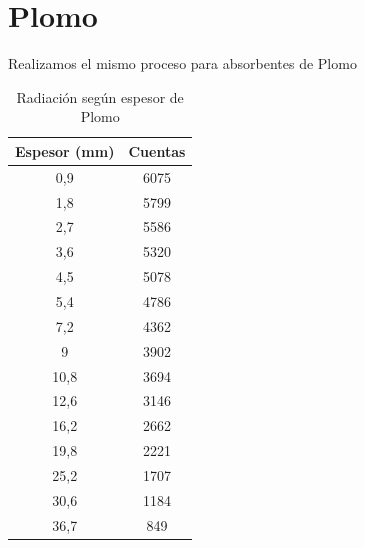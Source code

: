 \documentclass[a4paper,12pt,spanish]{article}
\begin{document}
	\section{Plomo}
	
	
	
	
	Realizamos el mismo proceso para absorbentes de Plomo
	
	
	\begin{table}[H]
		\centering
		\begin{tabular}{|c|c|}
			\hline
			Espesor (mm) & Cuentas \\ \hline
			0,9          & 6075    \\ \hline
			1,8          & 5799    \\ \hline
			2,7          & 5586    \\ \hline
			3,6          & 5320    \\ \hline
			4,5          & 5078    \\ \hline
			5,4          & 4786    \\ \hline
			7,2          & 4362    \\ \hline
			9            & 3902    \\ \hline
			10,8         & 3694    \\ \hline
			12,6         & 3146    \\ \hline
			16,2         & 2662    \\ \hline
			19,8         & 2221    \\ \hline
			25,2         & 1707    \\ \hline
			30,6         & 1184    \\ \hline
			36,7         & 849    \\ \hline
		\end{tabular}
		\caption{Radiación según espesor de Plomo}
	\end{table}
	
	
	
	
	
\end{document}
